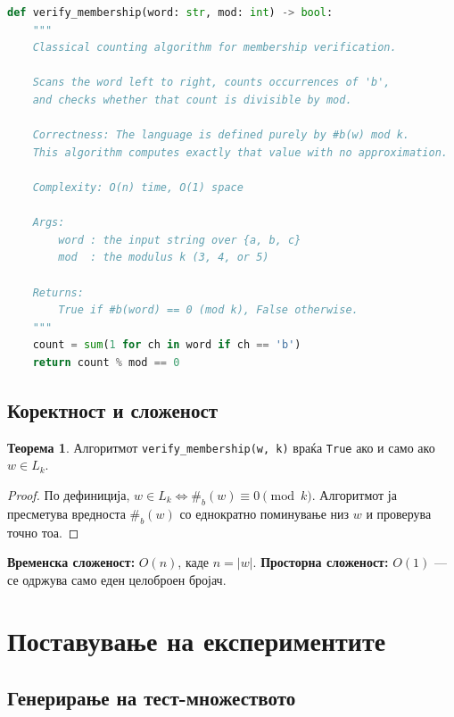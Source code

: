 \documentclass[12pt,a4paper]{article}
\theoremstyle{definition}
\newtheorem{theorem}{Теорема}
\begin{document}
\begin{lstlisting}[language=Python, caption={Алгоритам за верификација на членство во $L_k$},
showstringspaces=false,
    showspaces=false]
def verify_membership(word: str, mod: int) -> bool:
    """
    Classical counting algorithm for membership verification.

    Scans the word left to right, counts occurrences of 'b',
    and checks whether that count is divisible by mod.

    Correctness: The language is defined purely by #b(w) mod k.
    This algorithm computes exactly that value with no approximation.

    Complexity: O(n) time, O(1) space

    Args:
        word : the input string over {a, b, c}
        mod  : the modulus k (3, 4, or 5)

    Returns:
        True if #b(word) == 0 (mod k), False otherwise.
    """
    count = sum(1 for ch in word if ch == 'b')
    return count % mod == 0
\end{lstlisting}

\subsection{Коректност и сложеност}

\begin{theorem}
Алгоритмот \texttt{verify\_membership(w, k)} враќа \texttt{True} ако и само ако $w \in L_k$.
\end{theorem}
\begin{proof}
По дефиниција, $w \in L_k \iff \#_b(w) \equiv 0 \pmod{k}$. Алгоритмот ја пресметува вредноста $\#_b(w)$ со еднократно поминување низ $w$ и проверува точно тоа.
\end{proof}

\noindent\textbf{Временска сложеност:} $O(n)$, каде $n = |w|$.
\textbf{Просторна сложеност:} $O(1)$ --- се одржува само еден целоброен бројач.

\section{Поставување на експериментите}

\subsection{Генерирање на тест-множеството}
\end{document}
